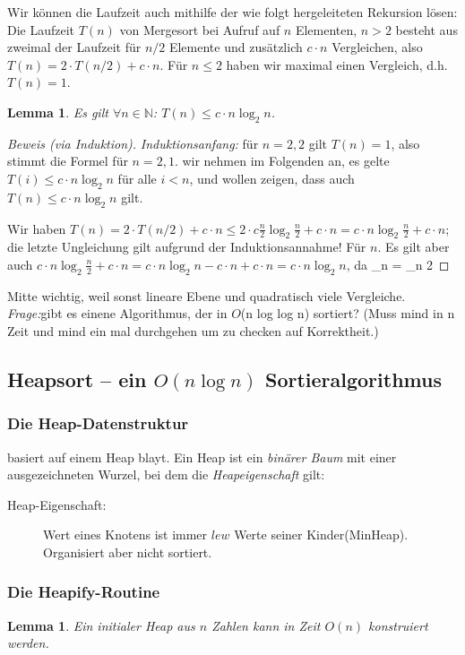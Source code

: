 \documentclass{article}
\newtheorem{lem}[thm]{Lemma}
\begin{document}
Wir können die Laufzeit auch mithilfe der wie folgt hergeleiteten Rekursion lösen:
Die Laufzeit $T(n)$ von Mergesort bei Aufruf auf $n$ Elementen, $n>2$ besteht aus zweimal der Laufzeit für $n/2$ Elemente und zusätzlich
$c\cdot n$ Vergleichen, also $T(n)=2\cdot T(n/2)+c \cdot n$. Für $n\leq 2$ haben wir maximal einen Vergleich, d.h. $T(n)=1$.

\begin{lem}
Es gilt $\forall n\in \mathbb{N}$: $T(n)\leq c\cdot n\log_2 n$.
\end{lem} 
\begin{proof}[Beweis (via Induktion)]
{\em Induktionsanfang:} für $n=2,2$ gilt $T(n)=1$, also stimmt die Formel für $n=2,1$.
wir nehmen im Folgenden an, es gelte $T(i)\leq c\cdot n\log_2 n$ für alle $i<n$, und wollen
zeigen, dass auch $T(n)\leq c\cdot n\log_2 n$ gilt.

Wir haben $T(n)=2\cdot T(n/2)+c\cdot n \leq 2\cdot c\frac{n}{2}\log_2 \frac{n}{2} + c\cdot n= c\cdot n\log_2 \frac{n}{2}+c\cdot n$; die letzte Ungleichung gilt
aufgrund der Induktionsannahme! Für $n$. Es gilt aber auch $c\cdot n\log_2\frac{n}{2}+c\cdot n= c\cdot n\log_2 n - c\cdot n + c\cdot n=c\cdot n\log_2 n$, da _n  = _n 2
\end{proof} \newline
Mitte wichtig, weil sonst lineare Ebene und quadratisch viele Vergleiche. \newline
\textit{Frage:}gibt es einene Algorithmus, der in $O$(n log log n) sortiert? (Muss mind in n Zeit und mind ein mal durchgehen um zu checken auf Korrektheit.)
\subsection{Heapsort -- ein $O(n\log n)$ Sortieralgorithmus}

\subsubsection{Die Heap-Datenstruktur}
basiert auf einem Heap blayt.
Ein Heap ist ein \emph{binärer Baum} mit einer ausgezeichneten Wurzel, bei dem die \emph{Heapeigenschaft} gilt:
\begin{description}
\item[Heap-Eigenschaft:]  Wert eines Knotens ist immer $lew$ Werte seiner Kinder(MinHeap). Organisiert aber nicht sortiert.
\end{description}

\subsubsection{Die Heapify-Routine}
\begin{lem}
Ein initialer Heap aus $n$ Zahlen kann in Zeit $O(n)$
konstruiert werden.
\end{lem}
\end{document}
